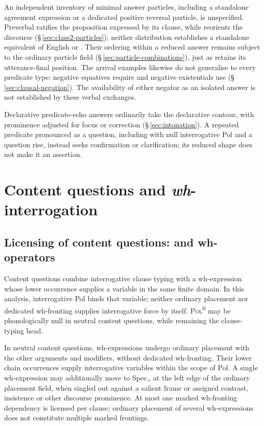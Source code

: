 An independent inventory of minimal answer particles, including a
standalone agreement expression or a dedicated positive reversal particle,
is unspecified. Preverbal  ratifies the proposition expressed by
its clause, while  reorients the discourse
(§\,\ref{sec:class2-particles}); neither distribution establishes a
standalone equivalent of English  or . Their ordering
within a reduced answer remains subject to the ordinary particle field
(§\,\ref{sec:particle-combinations}), just as  retains its
utterance-final position. The arrival examples likewise do not generalise
 to every predicate type: negative equatives require 
and negative existentials use 
(§\,\ref{sec:clausal-negation}). The availability of either negator as an
isolated answer is not established by these verbal exchanges.

Declarative predicate-echo answers ordinarily take the declarative contour,
with prominence adjusted for focus or correction
(§\,\ref{sec:intonation}). A repeated predicate pronounced as a question,
including with null interrogative Pol and a question rise, instead seeks
confirmation or clarification; its reduced shape does not make it an
assertion.


\section{Content questions and \textit{wh}-interrogation}
\label{sec:th-wh-interrogation}

\subsection{Licensing of content questions:  and wh-operators}
\label{sec:th-single-wh}

Content questions combine interrogative clause typing with a wh-expression
whose lower occurrence supplies a variable in the same finite domain. In this
analysis, interrogative Pol binds that variable; neither ordinary placement
nor dedicated wh-fronting supplies interrogative force by itself.
\textsc{Pol}\textsuperscript{0} may be phonologically null in neutral content
questions, while remaining the clause-typing head.

In neutral content questions, wh-expressions undergo ordinary placement
 with the other arguments and modifiers, without dedicated wh-fronting.
 Their lower chain occurrences supply interrogative variables within the
 scope of Pol. A single wh-expression may additionally move to
 Spec,, at the left edge of the ordinary placement field,
 when singled out against a salient frame or assigned contrast, insistence
 or other discourse prominence. At most one marked wh-fronting dependency
 is licensed per clause; ordinary placement of several wh-expressions does
 not constitute multiple marked frontings.

